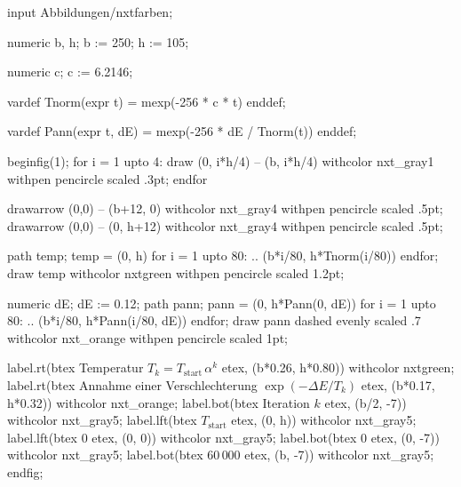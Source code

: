 %
%
\begin{mplibcode}[alt={Kurvendiagramm über die Iterationen eines Laufs:
  Die Temperatur fällt geometrisch von der Starttemperatur gegen null. Die
  Wahrscheinlichkeit, eine Verschlechterung anzunehmen, bleibt zunächst
  hoch und fällt dann ebenfalls auf null.}]
input Abbildungen/nxtfarben;

numeric b, h;
b := 250;
h := 105;

numeric c;
c := 6.2146;

vardef Tnorm(expr t) = mexp(-256 * c * t) enddef;

vardef Pann(expr t, dE) = mexp(-256 * dE / Tnorm(t)) enddef;

beginfig(1);
  for i = 1 upto 4:
    draw (0, i*h/4) -- (b, i*h/4)
      withcolor nxt_gray1 withpen pencircle scaled .3pt;
  endfor

  drawarrow (0,0) -- (b+12, 0) withcolor nxt_gray4 withpen pencircle scaled .5pt;
  drawarrow (0,0) -- (0, h+12) withcolor nxt_gray4 withpen pencircle scaled .5pt;

  path temp;
  temp = (0, h) for i = 1 upto 80: .. (b*i/80, h*Tnorm(i/80)) endfor;
  draw temp withcolor nxtgreen withpen pencircle scaled 1.2pt;

  numeric dE; dE := 0.12;
  path pann;
  pann = (0, h*Pann(0, dE))
    for i = 1 upto 80: .. (b*i/80, h*Pann(i/80, dE)) endfor;
  draw pann dashed evenly scaled .7 withcolor nxt_orange
    withpen pencircle scaled 1pt;

  label.rt(btex \footnotesize Temperatur $T_k=T_{\mathrm{start}}\,\alpha^k$ etex,
           (b*0.26, h*0.80)) withcolor nxtgreen;
  label.rt(btex \footnotesize Annahme einer Verschlechterung $\exp(-\Delta E/T_k)$ etex,
           (b*0.17, h*0.32)) withcolor nxt_orange;
  label.bot(btex \footnotesize Iteration $k$ etex, (b/2, -7)) withcolor nxt_gray5;
  label.lft(btex \footnotesize $T_{\mathrm{start}}$ etex, (0, h)) withcolor nxt_gray5;
  label.lft(btex \footnotesize $0$ etex, (0, 0)) withcolor nxt_gray5;
  label.bot(btex \footnotesize $0$ etex, (0, -7)) withcolor nxt_gray5;
  label.bot(btex \footnotesize $60\,000$ etex, (b, -7)) withcolor nxt_gray5;
endfig;
\end{mplibcode}
